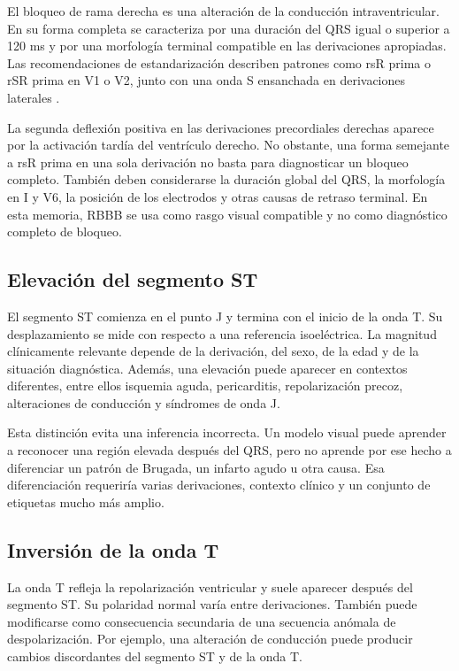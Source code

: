 El bloqueo de rama derecha es una alteración de la conducción intraventricular. En su forma completa se caracteriza por una duración del QRS igual o superior a 120 ms y por una morfología terminal compatible en las derivaciones apropiadas. Las recomendaciones de estandarización describen patrones como rsR prima o rSR prima en V1 o V2, junto con una onda S ensanchada en derivaciones laterales \cite{surawicz2009}.

La segunda deflexión positiva en las derivaciones precordiales derechas aparece por la activación tardía del ventrículo derecho. No obstante, una forma semejante a rsR prima en una sola derivación no basta para diagnosticar un bloqueo completo. También deben considerarse la duración global del QRS, la morfología en I y V6, la posición de los electrodos y otras causas de retraso terminal. En esta memoria, RBBB se usa como rasgo visual compatible y no como diagnóstico completo de bloqueo.

\subsection{Elevación del segmento ST}

El segmento ST comienza en el punto J y termina con el inicio de la onda T. Su desplazamiento se mide con respecto a una referencia isoeléctrica. La magnitud clínicamente relevante depende de la derivación, del sexo, de la edad y de la situación diagnóstica. Además, una elevación puede aparecer en contextos diferentes, entre ellos isquemia aguda, pericarditis, repolarización precoz, alteraciones de conducción y síndromes de onda J.

Esta distinción evita una inferencia incorrecta. Un modelo visual puede aprender a reconocer una región elevada después del QRS, pero no aprende por ese hecho a diferenciar un patrón de Brugada, un infarto agudo u otra causa. Esa diferenciación requeriría varias derivaciones, contexto clínico y un conjunto de etiquetas mucho más amplio.

\subsection{Inversión de la onda T}

La onda T refleja la repolarización ventricular y suele aparecer después del segmento ST. Su polaridad normal varía entre derivaciones. También puede modificarse como consecuencia secundaria de una secuencia anómala de despolarización. Por ejemplo, una alteración de conducción puede producir cambios discordantes del segmento ST y de la onda T.

